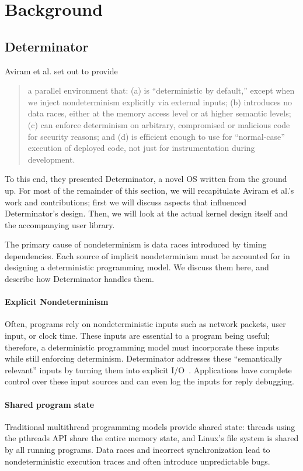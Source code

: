 
\section{Background}

\subsection{Determinator}

Aviram et al. set out to provide
\begin{quote}
a parallel environment that:
(a) is ``deterministic by default,'' except when
we inject nondeterminism explicitly via external inputs;
(b) introduces no data races, either at the memory access level
or at higher semantic levels; (c)
can enforce determinism on arbitrary, compromised or
malicious code for security reasons; and (d) is efﬁcient
enough to use for ``normal-case'' execution of deployed
code, not just for instrumentation during development. \cite{Aviram10}
\end{quote}

To this end, they presented Determinator, a novel OS written from the ground up.
For most of the remainder of this section, we will recapitulate Aviram et al.'s
work and contributions; first we will discuss aspects that influenced
Determinator's design. Then, we will look at the actual kernel design itself
and the accompanying user library.

The primary cause of nondeterminism is data races introduced by timing
dependencies. Each source of implicit nondeterminism must be accounted for in
designing a deterministic programming model. We discuss them here, and describe
how Determinator handles them.

\paragraph{Explicit Nondeterminism}
Often, programs rely on nondeterministic inputs such as network packets, user
input, or clock time. These inputs are essential to a program being useful;
therefore, a deterministic programming model must incorporate these inputs while
still enforcing determinism. Determinator addresses these ``semantically
relevant'' inputs by turning them into explicit I/O~\cite{Aviram10}.
Applications have complete control over these input sources and can even log the
inputs for reply debugging.

\paragraph{Shared program state}
Traditional multithread programming models provide shared state: threads using
the pthreads API share the entire memory state, and Linux's file system is
shared by all running programs. Data races and incorrect synchronization lead
to nondeterministic execution traces and often introduce unpredictable bugs.

